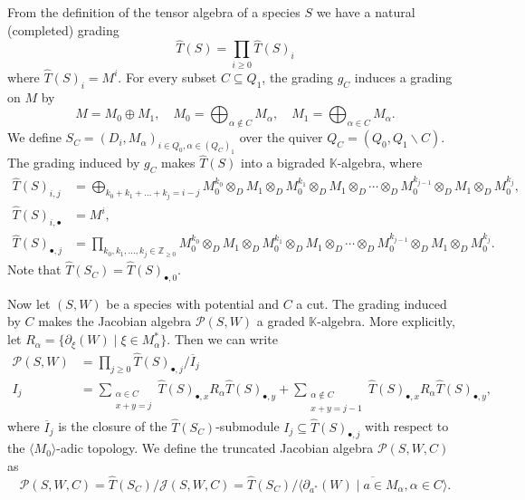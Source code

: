 \documentclass[a4paper, reqno]{amsart}
\theoremstyle{definition}
\newcommand{\Z}{\mathbb{Z}}
\newcommand{\K}{\mathbb{K}}
\begin{document}
From the definition of the tensor algebra of a species $S$ we have a natural (completed) grading
\begin{equation*}
	\widehat{T}(S) = \prod_{i\ge 0}\widehat{T}(S)_i
\end{equation*}
where $\widehat{T}(S)_i = M^i$. For every subset $C\subseteq Q_1$, the grading $g_C$ induces a grading on $M$ by
\begin{equation*}
	M = M_0 \oplus M_1, \quad M_0=\bigoplus_{\alpha\not\in C}M_\alpha, \quad M_1 = \bigoplus_{\alpha\in C}M_\alpha.
\end{equation*}
We define $S_C = (D_i, M_\alpha)_{i\in Q_0, \alpha\in (Q_C)_1}$ over the quiver $Q_C = (Q_0, Q_1\backslash C)$. The grading induced by $g_C$ makes $\widehat{T}(S)$ into a bigraded $\K$-algebra, where
\begin{equation*}
	\begin{aligned}
		\widehat{T}(S)_{i, j} &= \bigoplus_{k_0 + k_1 + \dots + k_j = i - j} M_0^{k_0} \otimes_D M_1 \otimes_D M_0^{k_1} \otimes_D M_1 \otimes_D \cdots \otimes_D M_0^{k_{j-1}} \otimes_D M_1 \otimes_D M_0^{k_j}, \\
		\widehat{T}(S)_{i, \bullet} &= M^i, \\
		\widehat{T}(S)_{\bullet, j} &= \prod_{k_0, k_1, \dots, k_j\in \Z_{\ge 0}} M_0^{k_0} \otimes_D M_1 \otimes_D M_0^{k_1} \otimes_D M_1 \otimes_D \cdots \otimes_D M_0^{k_{j-1}} \otimes_D M_1 \otimes_D M_0^{k_j}.
	\end{aligned}
\end{equation*}
Note that $\widehat{T}(S_C) = \widehat{T}(S)_{\bullet, 0}$.

Now let $(S, W)$ be a species with potential and $C$ a cut. The grading induced by $C$ makes the Jacobian algebra $\mathcal{P}(S, W)$ a graded $\K$-algebra. More explicitly, let $R_\alpha = \{\partial_{\xi}(W) \mid \xi\in M_\alpha^*\}$. Then we can write
\begin{equation*}
	\begin{aligned}
		\mathcal{P}(S, W) &= \prod_{j\ge 0}\widehat{T}(S)_{\bullet, j} / \overline{I}_j \\
		I_j &= \sum_{\substack{\alpha\in C \\ x + y = j}}\widehat{T}(S)_{\bullet, x} R_\alpha \widehat{T}(S)_{\bullet, y} + \sum_{\substack{\alpha\not\in C \\ x + y = j-1}}\widehat{T}(S)_{\bullet, x} R_\alpha \widehat{T}(S)_{\bullet, y},
	\end{aligned}
\end{equation*}
where $\overline{I}_j$ is the closure of the $\widehat{T}(S_C)$-submodule $I_j\subseteq \widehat{T}(S)_{\bullet, j}$ with respect to the $\langle M_0 \rangle$-adic topology. We define the truncated Jacobian algebra $\mathcal{P}(S, W, C)$ as
\begin{equation*}
	\mathcal{P}(S, W, C) = \widehat{T}(S_C)/\mathcal{J}(S, W, C) = \widehat{T}(S_C)/\overline{\langle \partial_{a^*}(W) \mid a\in M_\alpha, \alpha\in C\rangle}.
\end{equation*}
\end{document}
